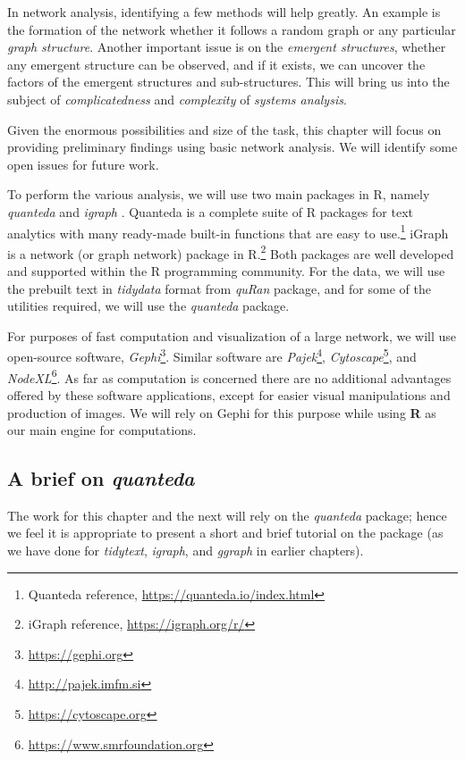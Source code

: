 \documentclass[
]{article}
\begin{document}
In network analysis, identifying a few methods will help greatly. An example is the formation of the network whether it follows a random graph or any particular \emph{graph structure}. Another important issue is on the \emph{emergent structures}, whether any emergent structure can be observed, and if it exists, we can uncover the factors of the emergent structures and sub-structures. This will bring us into the subject of \emph{complicatedness} and \emph{complexity} of \emph{systems analysis}.

Given the enormous possibilities and size of the task, this chapter will focus on providing preliminary findings using basic network analysis. We will identify some open issues for future work.

To perform the various analysis, we will use two main packages in R, namely \emph{quanteda} \citep{quanteda} and \emph{igraph} \citep{igraph}. Quanteda is a complete suite of R packages for text analytics with many ready-made built-in functions that are easy to use.\footnote{Quanteda reference, \url{https://quanteda.io/index.html}} iGraph is a network (or graph network) package in R.\footnote{iGraph reference, \url{https://igraph.org/r/}} Both packages are well developed and supported within the R programming community. For the data, we will use the prebuilt text in \emph{tidydata} format from \emph{quRan} package, and for some of the utilities required, we will use the \emph{quanteda} package.

For purposes of fast computation and visualization of a large network, we will use open-source software, \emph{Gephi}\footnote{\url{https://gephi.org}}. Similar software are \emph{Pajek}\footnote{\url{http://pajek.imfm.si}}, \emph{Cytoscape}\footnote{\url{https://cytoscape.org}}, and \emph{NodeXL}\footnote{\url{https://www.smrfoundation.org}}. As far as computation is concerned there are no additional advantages offered by these software applications, except for easier visual manipulations and production of images. We will rely on Gephi for this purpose while using \textbf{R} as our main engine for computations.

\hypertarget{a-brief-tutorial-on-quanteda}{%
\subsection{\texorpdfstring{A brief on \emph{quanteda}}{A brief on quanteda}}\label{a-brief-tutorial-on-quanteda}}

The work for this chapter and the next will rely on the \emph{quanteda} package; hence we feel it is appropriate to present a short and brief tutorial on the package (as we have done for \emph{tidytext}, \emph{igraph}, and \emph{ggraph} in earlier chapters).
\end{document}
